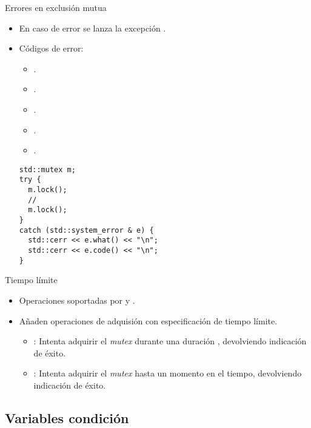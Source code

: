 \begin{frame}[fragile]{Errores en exclusión mutua}
\begin{itemize}
  \item En caso de error se lanza la excepción .
  \item Códigos de error:
    \begin{itemize}
      \item {}.
      \item {}.
      \item {}.
      \item {}.
      \item {}.
    \end{itemize}
\begin{lstlisting}
std::mutex m;
try {
  m.lock();
  // 
  m.lock();
}
catch (std::system_error & e) {
  std::cerr << e.what() << "\n";
  std::cerr << e.code() << "\n";
}
\end{lstlisting}
\end{itemize}
\end{frame}

\begin{frame}{Tiempo límite}
\begin{itemize}
  \item Operaciones soportadas por  y .
  \vfill
  \item Añaden operaciones de adquisión con especificación de tiempo límite.
    \begin{itemize}
      \item {}: Intenta adquirir el \emph{mutex} durante una duración
            , devolviendo indicación de éxito.
      \item {}: Intenta adquirir el \emph{mutex} hasta un momento
            en el tiempo, devolviendo indicación de éxito.
    \end{itemize}
\end{itemize}
\end{frame}

\subsection{Variables condición}

